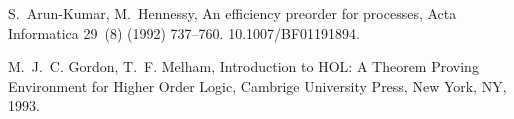 \documentclass[GCNS]{yincog}
\theoremstyle{remark}
\theoremstyle{theorem}
\theoremstyle{remark}
\begin{document}
\begin{backmatter}
\begin{thebibliography}{}
\begin{bsubitem}
\begin{bcontribution}%
\end{bcontribution}
\begin{bhost}
\begin{bissue}
\end{bissue}
\end{bhost}
\end{bsubitem}
%
\OrigBibText
S.~Arun-Kumar, M.~Hennessy, An efficiency preorder for processes, Acta
Informatica 29~(8) (1992) 737--760. 10.1007/BF01191894.
\endOrigBibText
{}%
\endbibitem

\begin{bsubitem}
\begin{bcontribution}%
\end{bcontribution}
\begin{bhost}
\begin{bbook}
\end{bbook}
\end{bhost}
\end{bsubitem}
%
\OrigBibText
M.~J.~C. Gordon, T.~F. Melham, Introduction to {HOL}: A Theorem Proving
Environment for Higher Order Logic, Cambrige University Press, New York,
NY, 1993.
\endOrigBibText
{}%
\endbibitem


\end{thebibliography}
\end{backmatter}
\end{document}
